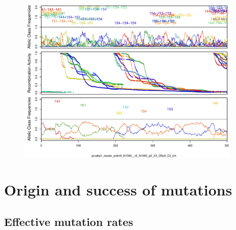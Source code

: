\documentclass[a4paper,10pt]{article}
\begin{document}
 
\begin{figure}[htb]
\begin{center}
\leavevmode
\includegraphics[width=0.95\textwidth] {./Images/prdm9_freqs_labels_C0_U4_b.pdf}
\end{center}

\caption{\small{}}
\label{QuasispeciesExample}
\end{figure}



\section{Origin and success of mutations}

\subsection{Effective mutation rates}
\end{document}
